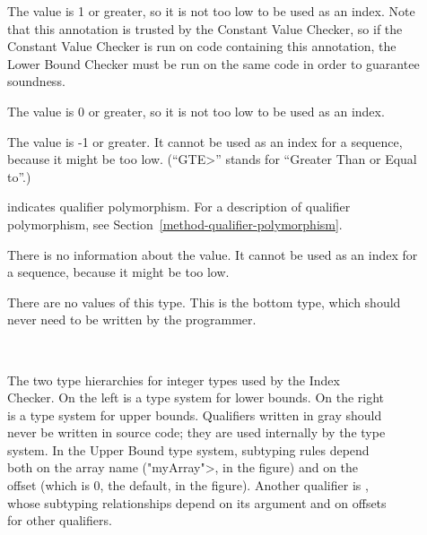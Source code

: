 \begin{description}
\item[]
  The value is 1 or greater, so it is not too low to be used as an index.
  Note that this annotation is trusted by the Constant Value Checker,
  so if the Constant Value Checker is run on code containing this annotation,
  the Lower Bound Checker must be run on the same code in order to
  guarantee soundness.
\item[]
  The value is 0 or greater, so it is not too low to be used as an index.
\item[]
  The value is -1 or greater.
  It cannot be used as an index for a sequence, because it might be too low.
  (``\<GTE>'' stands for ``Greater Than or Equal to''.)
\item[]
  indicates qualifier polymorphism.
  For a description of qualifier polymorphism, see
  Section~\ref{method-qualifier-polymorphism}.
\item[]
  There is no information about the value.
  It cannot be used as an index for a sequence, because it might be too low.
\item[]
    There are no values of this type. This is the bottom type, which
    should never need to be written by the programmer.
\end{description}

\begin{figure}
\begin{center}
  \hfill
  ~~~~\hfill~~~~
  \hfill
\end{center}
  \caption{The two type hierarchies for integer types used by the Index
    Checker.  On the left is a type system for lower bounds.  On the right
    is a type system for upper bounds.  Qualifiers written in gray should
    never be written in source code; they are used internally by the type
    system.
    \newline
    In the Upper Bound type system, subtyping rules depend both on the
    array name (\<"myArray">, in the figure) and on the offset (which is 0,
    the default, in the figure).  Another qualifier is
    , whose subtyping
    relationships depend on its argument and on offsets for other qualifiers.
 }
  \label{fig-index-int-types}
\end{figure}


